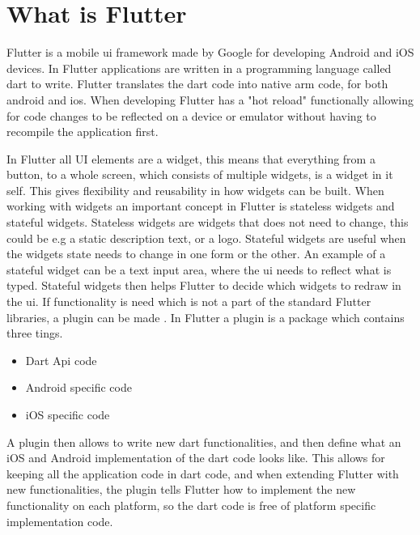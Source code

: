 \section{What is Flutter}


Flutter is a mobile \gls{ui} framework made by Google for developing Android and iOS devices\cite{flutterFAQ}. In Flutter applications  are written in a programming language called dart  to write. Flutter translates the dart code into native arm code, for both android and ios.
When developing Flutter has a "hot reload" functionally allowing for code changes to be reflected on a device or emulator without having to recompile the application first.

In Flutter all UI elements are a widget, this means that everything from a  button, to a  whole screen, which consists of multiple widgets, is a widget in it self. This gives flexibility and reusability in how widgets can be built. When working with widgets an important concept in Flutter is stateless widgets and stateful widgets. Stateless widgets are widgets that does not need to change, this could be  e.g a static description text, or a logo. Stateful widgets are useful when the widgets state needs to change in one form or the other.  An example of a stateful widget can be a text input area, where the \gls{ui} needs to reflect what is typed. Stateful widgets then helps Flutter to decide which widgets to redraw in the \gls{ui}.
If functionality is need which is not a part of the standard Flutter libraries, a plugin can be made \cite{docker_plugins}. In Flutter a plugin is a package which contains three tings.

\begin{itemize}
    \item  Dart Api code
    \item  Android specific code
    \item  iOS specific code
\end{itemize}

A plugin then allows to write new dart functionalities, and then define what an iOS and Android implementation of the dart code looks like. This allows for keeping all the application code in dart code, and when extending Flutter  with new functionalities, the plugin tells Flutter how to implement the new functionality on each platform, so the dart code is free of platform specific implementation code.